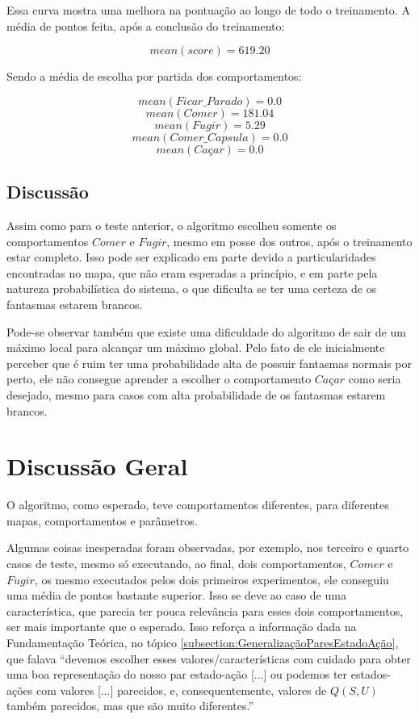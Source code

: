 Essa curva mostra uma melhora na pontuação ao longo de todo o treinamento. A média de pontos feita, após a conclusão do treinamento:

$$ mean \left( score \right) = 619.20 $$

Sendo a média de escolha por partida dos comportamentos:

$$ mean \left( Ficar\_Parado \right) = 0.0 $$
$$ mean \left( Comer \right) = 181.04 $$
$$ mean \left( Fugir \right) = 5.29 $$
$$ mean \left( Comer\_Capsula \right) = 0.0 $$
$$ mean \left( \textit{Caçar} \right) = 0.0 $$


\subsection{Discussão}

Assim como para o teste anterior, o algoritmo escolheu somente os comportamentos $ Comer $ e $ Fugir $, mesmo em posse dos outros, após o treinamento estar completo. Isso pode ser explicado em parte devido a particularidades encontradas no mapa, que não eram esperadas a princípio, e em parte pela natureza probabilística do sistema, o que dificulta se ter uma certeza de os fantasmas estarem brancos.

Pode-se observar também que existe uma dificuldade do algoritmo de sair de um máximo local para alcançar um máximo global. Pelo fato de ele inicialmente perceber que é ruim ter uma probabilidade alta de possuir fantasmas normais por perto, ele não consegue aprender a escolher o comportamento $ \textit{Caçar} $ como seria desejado, mesmo para casos com alta probabilidade de os fantasmas estarem brancos.

\section{Discussão Geral}

O algoritmo, como esperado, teve comportamentos diferentes, para diferentes mapas, comportamentos e parâmetros.

Algumas coisas inesperadas foram observadas, por exemplo, nos terceiro e quarto casos de teste, mesmo só executando, ao final, dois comportamentos, $ Comer $ e $ Fugir $, os mesmo executados pelos dois primeiros experimentos, ele conseguiu uma média de pontos bastante superior. Isso se deve ao caso de uma característica, que parecia ter pouca relevância para esses dois comportamentos, ser mais importante que o esperado. Isso reforça a informação dada na Fundamentação Teórica, no tópico \ref{subsection:GeneralizaçãoParesEstadoAção}, que falava ``devemos escolher esses valores/características com cuidado para obter uma boa representação do nosso par estado-ação [...] ou podemos ter estados-ações com valores [...] parecidos, e, consequentemente, valores de $ Q \left( S, U \right) $ também parecidos, mas que são muito diferentes.''

